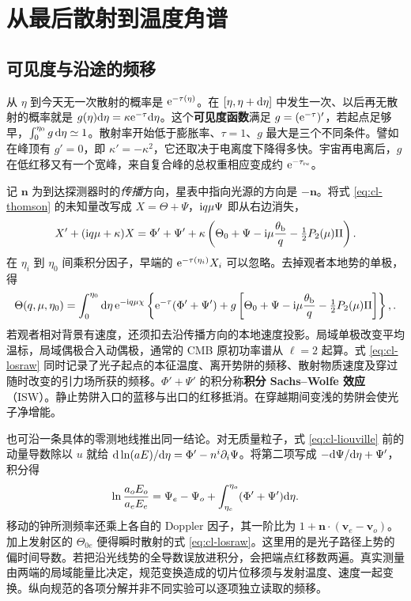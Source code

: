 \section{从最后散射到温度角谱}\label{sec:cosmo-cmb-angular}

\subsection{可见度与沿途的频移}

从 $\eta$ 到今天无一次散射的概率是 $\mathrm{e}^{-\tau(\eta)}$。在 $[\eta,\eta+\dd\eta]$ 中发生一次、以后再无散射的概率就是 $g(\eta)\dd\eta=\kappa\mathrm{e}^{-\tau}\dd\eta$。这个\textbf{可见度函数}满足 $g=(\mathrm{e}^{-\tau})'$，若起点足够早，$\int_0^{\eta_0}g\,\dd\eta\simeq1$。散射率开始低于膨胀率、$\tau=1$、$g$ 最大是三个不同条件。譬如在峰顶有 $g'=0$，即 $\kappa'=-\kappa^2$，它还取决于电离度下降得多快。宇宙再电离后，$g$ 在低红移又有一个宽峰，来自复合峰的总权重相应变成约 $\mathrm{e}^{-\tau_{\rm re}}$。

记 $\bm n$ 为到达探测器时的\emph{传播}方向，星表中指向光源的方向是 $-\bm n$。将式 \eqref{eq:cl-thomson} 的未知量改写成 $X=\Theta+\Psi$，$\mathrm{i} q\mu\Psi$ 即从右边消失，
\[
 X'+(\mathrm{i} q\mu+\kappa)X
  =\Phi'+\Psi'+\kappa
       \left(\Theta_0+\Psi-\mathrm{i}\mu\frac{\theta_{\rm b}}q-\tfrac12 P_2(\mu)\Pi\right).
\]
在 $\eta_i$ 到 $\eta_0$ 间乘积分因子，早端的 $\mathrm{e}^{-\tau(\eta_i)}X_i$ 可以忽略。去掉观者本地势的单极，得
\begin{equation}\label{eq:cl-losraw}
 \Theta(q,\mu,\eta_0)
 =\int_0^{\eta_0}\dd\eta\,\mathrm{e}^{-\mathrm{i} q\mu\chi}
 \left\{\mathrm{e}^{-\tau}(\Phi'+\Psi')+
 g\left[\Theta_0+\Psi-\mathrm{i}\mu\frac{\theta_{\rm b}}q
                 -\tfrac12 P_2(\mu)\Pi\right]\right\},.
\end{equation}
若观者相对背景有速度，还须扣去沿传播方向的本地速度投影。局域单极改变平均温标，局域偶极合入动偶极，通常的 CMB 原初功率谱从 $\ell=2$ 起算。式 \eqref{eq:cl-losraw} 同时记录了光子起点的本征温度、离开势阱的频移、散射物质速度及穿过随时改变的引力场所获的频移。$\Phi'+\Psi'$ 的积分称\textbf{积分 Sachs--Wolfe 效应}（ISW）。静止势阱入口的蓝移与出口的红移抵消。在穿越期间变浅的势阱会使光子净增能。

也可沿一条具体的零测地线推出同一结论。对无质量粒子，式 \eqref{eq:cl-liouville} 前的动量导数除以 $u$ 就给 $\dd\ln(a E)/\dd\eta=\Phi'-n^i\partial_i\Psi$。将第二项写成 $-\dd\Psi/\dd\eta+\Psi'$，积分得
\[
 \ln\frac{a_oE_o}{a_eE_e}=\Psi_e-\Psi_o+
                      \int_{\eta_e}^{\eta_o}(\Phi'+\Psi')\dd\eta .
\]
移动的钟所测频率还乘上各自的 Doppler 因子，其一阶比为 $1+\bm n\cdot(\bm v_e-\bm v_o)$。加上发射区的 $\Theta_{0e}$ 便得瞬时散射的式 \eqref{eq:cl-losraw}。这里用的是光子路径上势的偏时间导数。若把沿光线势的全导数误放进积分，会把端点红移数两遍。真实测量由两端的局域能量比决定，规范变换造成的切片位移须与发射温度、速度一起变换。纵向规范的各项分解并非不同实验可以逐项独立读取的频移。

